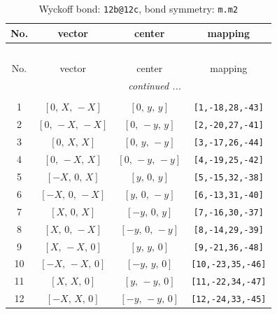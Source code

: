 \documentclass[fleqn,8pt]{jsarticle}
\begin{document}
\begin{longtable}{cccc}
\caption{Wyckoff bond: {\tt 12b@12c}, bond symmetry: {\tt m.m2}}
 \\
 \hline \hline
No. & vector & center & mapping \\ \hline \endfirsthead

\multicolumn{3}{l}{\tablename\ \thetable{}} \\
 \hline \hline
No. & vector & center & mapping \\ \hline \endhead

 \hline \hline
\multicolumn{3}{r}{\footnotesize\it continued ...} \\ \endfoot

 \hline \hline
\multicolumn{3}{r}{} \\ \endlastfoot

1 & $\left[ 0,\, X,\, - X \right]$ & $\left[ 0,\, y,\, y \right]$ & {\tt [1,-18,28,-43]} \\ \hline
2 & $\left[ 0,\, - X,\, - X \right]$ & $\left[ 0,\, - y,\, y \right]$ & {\tt [2,-20,27,-41]} \\ \hline
3 & $\left[ 0,\, X,\, X \right]$ & $\left[ 0,\, y,\, - y \right]$ & {\tt [3,-17,26,-44]} \\ \hline
4 & $\left[ 0,\, - X,\, X \right]$ & $\left[ 0,\, - y,\, - y \right]$ & {\tt [4,-19,25,-42]} \\ \hline
5 & $\left[ - X,\, 0,\, X \right]$ & $\left[ y,\, 0,\, y \right]$ & {\tt [5,-15,32,-38]} \\ \hline
6 & $\left[ - X,\, 0,\, - X \right]$ & $\left[ y,\, 0,\, - y \right]$ & {\tt [6,-13,31,-40]} \\ \hline
7 & $\left[ X,\, 0,\, X \right]$ & $\left[ - y,\, 0,\, y \right]$ & {\tt [7,-16,30,-37]} \\ \hline
8 & $\left[ X,\, 0,\, - X \right]$ & $\left[ - y,\, 0,\, - y \right]$ & {\tt [8,-14,29,-39]} \\ \hline
9 & $\left[ X,\, - X,\, 0 \right]$ & $\left[ y,\, y,\, 0 \right]$ & {\tt [9,-21,36,-48]} \\ \hline
10 & $\left[ - X,\, - X,\, 0 \right]$ & $\left[ - y,\, y,\, 0 \right]$ & {\tt [10,-23,35,-46]} \\ \hline
11 & $\left[ X,\, X,\, 0 \right]$ & $\left[ y,\, - y,\, 0 \right]$ & {\tt [11,-22,34,-47]} \\ \hline
12 & $\left[ - X,\, X,\, 0 \right]$ & $\left[ - y,\, - y,\, 0 \right]$ & {\tt [12,-24,33,-45]} \\
\end{longtable}
\renewcommand{\arraystretch}{1.2}
\end{document}
